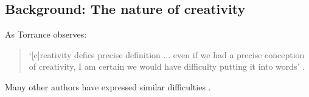 \documentclass[10pt,letterpaper]{article}
\begin{document}
\subsection*{Background:  The nature of creativity} \label{background}

As Torrance observes:

\begin{quote}
`[c]reativity defies precise definition ... even if we had a precise conception of creativity, I am certain we would have difficulty putting it into words' \cite[p. 43]{torrance88}. 
\end{quote}

Many other authors have expressed similar difficulties \cite{rhodes61,sternberg99a,kaufman09}. 
%
\end{document}
